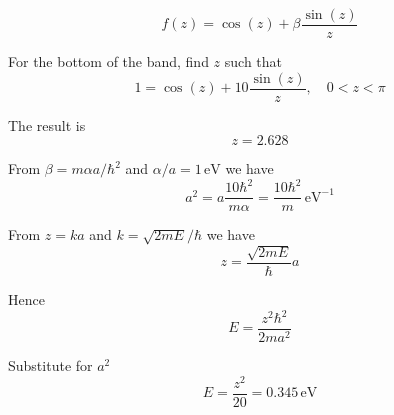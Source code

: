 


\begin{equation*}
f(z)=\cos(z)+\beta\frac{\sin(z)}{z}
\tag{5.73}
\end{equation*}

For the bottom of the band, find $z$ such that
\begin{equation*}
1=\cos(z)+10\frac{\sin(z)}{z},\quad0<z<\pi
\end{equation*}

The result is
\begin{equation*}
z=2.628
\end{equation*}

From $\beta=m\alpha a/\hbar^2$ and $\alpha/a=1\,\text{eV}$ we have
\begin{equation*}
a^2=a\frac{10\hbar^2}{m\alpha}=\frac{10\hbar^2}{m}\,\text{eV}^{-1}
\end{equation*}

From $z=ka$ and $k=\sqrt{2mE}/\hbar$ we have
\begin{equation*}
z=\frac{\sqrt{2mE}}{\hbar}a
\end{equation*}

Hence
\begin{equation*}
E=\frac{z^2\hbar^2}{2ma^2}
\end{equation*}

Substitute for $a^2$
\begin{equation*}
E=\frac{z^2}{20}=0.345\,\text{eV}
\end{equation*}


